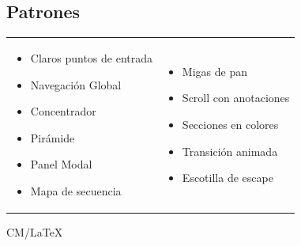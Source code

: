 \documentclass[letter, 10pt]{article}
\begin{document}
\subsection{Patrones}
\begin{tabular}{p{} p{}}

\begin{itemize}
	\item Claros puntos de entrada
	\item Navegación Global
	\item Concentrador
	\item Pirámide
	\item Panel Modal
	\item Mapa de secuencia
\end{itemize}
&
\begin{itemize}
	\item Migas de pan
	\item Scroll con anotaciones
	\item Secciones en colores
	\item Transición animada
	\item Escotilla de escape
\end{itemize}
\\
\end{tabular}

\vfill \hfill CM/\LaTeX
\end{document}
